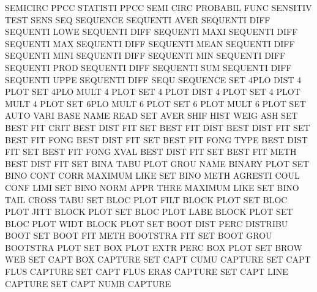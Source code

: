 SEMICIRC PPCC                           STATISTI PPCC
SEMI     CIRC                           PROBABIL FUNC
SENSITIV                                TEST     SENS
SEQ                                     SEQUENCE
SEQUENTI AVER                           SEQUENTI DIFF
SEQUENTI LOWE                           SEQUENTI DIFF
SEQUENTI MAXI                           SEQUENTI DIFF
SEQUENTI MAX                            SEQUENTI DIFF
SEQUENTI MEAN                           SEQUENTI DIFF
SEQUENTI MINI                           SEQUENTI DIFF
SEQUENTI MIN                            SEQUENTI DIFF
SEQUENTI PROD                           SEQUENTI DIFF
SEQUENTI SUM                            SEQUENTI DIFF
SEQUENTI UPPE                           SEQUENTI DIFF
SEQU                                    SEQUENCE
SET      4PLO DIST                      4        PLOT
SET      4PLO MULT                      4        PLOT
SET      4    PLOT DIST                 4        PLOT
SET      4    PLOT MULT                 4        PLOT
SET      6PLO MULT                      6        PLOT
SET      6    PLOT MULT                 6        PLOT
SET      AUTO VARI BASE NAME            READ
SET      AVER SHIF HIST WEIG            ASH
SET      BEST FIT  CRIT                 BEST     DIST FIT
SET      BEST FIT  DIST                 BEST     DIST FIT
SET      BEST FIT  FONG                 BEST     DIST FIT
SET      BEST FIT  FONG TYPE            BEST     DIST FIT
SET      BEST FIT  FONG XVAL            BEST     DIST FIT
SET      BEST FIT  METH                 BEST     DIST FIT
SET      BINA TABU PLOT GROU NAME       BINARY   PLOT
SET      BINO CONT CORR                 MAXIMUM  LIKE
SET      BINO METH                      AGRESTI  COUL CONF LIMI
SET      BINO NORM APPR THRE            MAXIMUM  LIKE
SET      BINO TAIL                      CROSS    TABU
SET      BLOC PLOT FILT                 BLOCK    PLOT
SET      BLOC PLOT JITT                 BLOCK    PLOT
SET      BLOC PLOT LABE                 BLOCK    PLOT
SET      BLOC PLOT WIDT                 BLOCK    PLOT
SET      BOOT DIST PERC                 DISTRIBU BOOT
SET      BOOT FIT  METH                 BOOTSTRA FIT
SET      BOOT GROU                      BOOTSTRA PLOT
SET      BOX  PLOT EXTR PERC            BOX      PLOT
SET      BROW                           WEB
SET      CAPT BOX                       CAPTURE
SET      CAPT CUMU                      CAPTURE
SET      CAPT FLUS                      CAPTURE
SET      CAPT FLUS ERAS                 CAPTURE
SET      CAPT LINE                      CAPTURE
SET      CAPT NUMB                      CAPTURE
